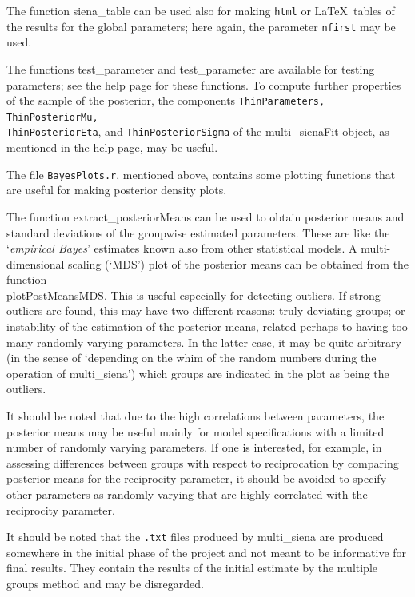 \documentclass[a4paper,fleqn,11pt]{article}
\newcommand{\+}{\, + \,}
\newcommand{\sfn}[1]{\textsf{#1}}
\begin{document}
The function \textsf{siena\_table} can be used also for making
\texttt{html} or \LaTeX\ tables of the results for the global parameters;
here again, the parameter \texttt{nfirst} may be used.

The functions \sfn{test\_parameter} and \sfn{test\_parameter}
are available for testing parameters; see the help page for these functions.
To compute further properties of the sample of the posterior,
the components
\texttt{ThinParameters, ThinPosteriorMu, \\
ThinPosteriorEta}, and \texttt{ThinPosteriorSigma} of the
\sfn{multi\_sienaFit} object, as mentioned in the help page, may be useful.

The file \texttt{BayesPlots.r}, mentioned above, contains some plotting
functions that are useful for making posterior density plots.

The function \sfn{extract\_posteriorMeans} can be used to obtain
posterior means and standard deviations of the groupwise estimated
parameters. These are like the `\emph{empirical Bayes}' estimates
known also from other statistical models.
A multi-dimensional scaling (`MDS') plot of the posterior means
can be obtained from the function \\
\sfn{plotPostMeansMDS}.
This is useful especially for detecting outliers.
If strong outliers are found, this may have two different reasons:
truly deviating groups; or instability of the estimation
of the posterior means, related perhaps to having too many
randomly varying parameters.
In the latter case, it may be quite arbitrary (in the sense of
`depending on the whim of the random numbers during the
operation of \textsf{multi\_siena}') which groups are
indicated in the plot as being the outliers.

It should be noted that due to the high correlations between parameters,
the posterior means may be useful mainly for model specifications
with a limited number of randomly varying parameters.
If one is interested, for example, in assessing differences
between groups with respect to reciprocation by comparing
posterior means for the reciprocity parameter, it should be avoided
to specify other parameters as randomly varying that are
highly correlated with the reciprocity parameter.

It should be noted that the \texttt{.txt} files produced by \sfn{multi\_siena}
are produced somewhere in the initial phase of the project and not meant
to be informative for final results. They contain the results of the
initial estimate by the multiple groups method and may be disregarded.
\medskip
\end{document}
